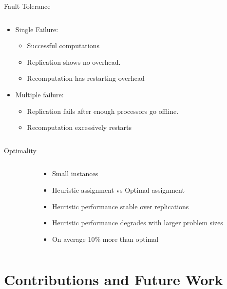 \documentclass{beamer}
\begin{document}
\begin{frame}{Fault Tolerance}
\begin{columns}
\begin{column}{5cm}
\begin{itemize}
	\item Single Failure:
	\begin{itemize}
		\item Successful computations
		\item Replication shows no overhead.
		\item Recomputation has restarting overhead
	\end{itemize}
	\item Multiple failure:
	\begin{itemize}
		\item Replication fails after enough processors go offline.
		\item Recomputation excessively restarts
	\end{itemize}
\end{itemize}
\end{column}
\begin{column}{5cm}
\end{column}
\end{columns}
\end{frame}

\begin{frame}{Optimality}
\begin{columns}
\begin{column}{5cm}
\end{column}
\begin{column}{5cm}
\begin{itemize}
	\item Small instances
	\item Heuristic assignment vs Optimal assignment
	\item Heuristic performance stable over replications
	\item Heuristic performance degrades with larger problem sizes
	\item On average 10\% more than optimal
\end{itemize}
\end{column}
\end{columns}
\end{frame}

\section{Contributions and Future Work}
\end{document}
